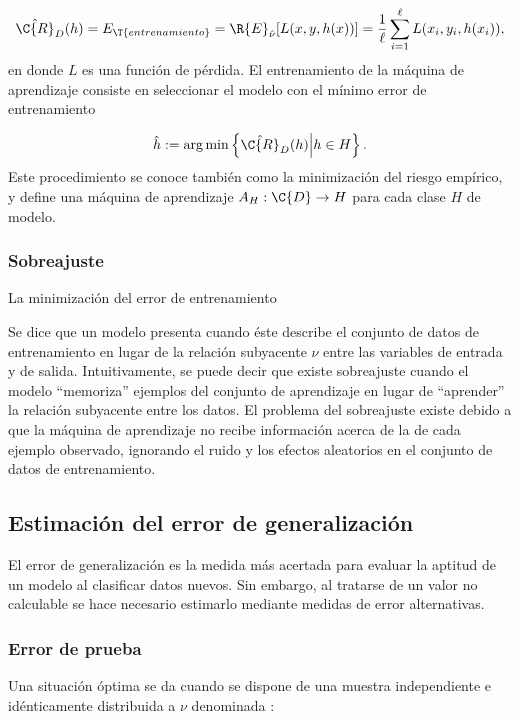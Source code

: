 \begin{align}
  \hat{\C{R}}_D(h)=E_\T{entrenamiento}=\R{E}_{\hat{\nu}}[L(x,y,h(x))]
  =\frac{1}{\ell}\sum_{i=1}^\ell L(x_i, y_i, h(x_i)),
\end{align}
en donde $L$ es una función de pérdida.
El entrenamiento de la máquina de aprendizaje consiste en
seleccionar el modelo con el mínimo error de entrenamiento

\begin{align}
  \hat{h}:=\arg \min \left\{ \hat{\C{R}}_D(h)\middle|h \in H\right\}.
\end{align}
Este procedimiento se conoce también como la minimización del riesgo
empírico, y define una máquina de aprendizaje
$A_H:\C{D}\rightarrow{}H$ para cada clase $H$ de modelo.

\subsubsection{Sobreajuste}
La minimización del error de entrenamiento

Se dice que un modelo presenta  cuando éste describe
el conjunto de datos de entrenamiento en lugar de la relación
subyacente $\nu$ entre las variables de entrada y de salida.
Intuitivamente, se puede decir que existe sobreajuste cuando el modelo
``memoriza'' ejemplos del conjunto de aprendizaje en lugar de
``aprender'' la relación subyacente entre los datos.  El problema del
sobreajuste existe debido a que la máquina de aprendizaje no recibe
información acerca de la  de cada ejemplo observado,
ignorando el ruido y los efectos aleatorios en el conjunto de datos de
entrenamiento.

\subsection{Estimación del error de generalización}
El error de generalización es la medida más acertada para evaluar la
aptitud de un modelo al clasificar datos nuevos.  Sin embargo, al
tratarse de un valor no calculable se hace necesario estimarlo
mediante medidas de error alternativas.

\subsubsection{Error de prueba}
Una situación óptima se da cuando se dispone de una muestra
independiente e idénticamente distribuida a $\nu$ denominada
:

